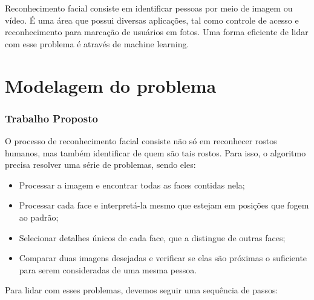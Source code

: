 \documentclass[twoside,conference,a4paper]{IEEEtran}
\begin{document}
Reconhecimento facial consiste em identificar pessoas por meio de imagem ou vídeo. É uma área que possui diversas aplicações, tal como controle de acesso e reconhecimento para marcação de usuários em fotos. Uma forma eficiente de lidar com esse problema é através de machine learning.



\section{Modelagem do problema} 
\subsubsection{Trabalho Proposto}
O processo de reconhecimento facial consiste não só em reconhecer rostos humanos, mas também identificar de quem são tais rostos. Para isso, o algoritmo precisa resolver uma série de problemas, sendo eles:
\begin{itemize}
    \item Processar a imagem e encontrar todas as faces contidas nela;
    \item Processar cada face e interpretá-la mesmo que estejam em posições que fogem ao padrão;
    \item Selecionar detalhes únicos de cada face, que a distingue de outras faces;
    \item Comparar duas imagens desejadas e verificar se elas são próximas o suficiente para serem consideradas de uma mesma pessoa.
\end{itemize}
Para lidar com esses problemas, devemos seguir uma sequência de passos:
\end{document}
